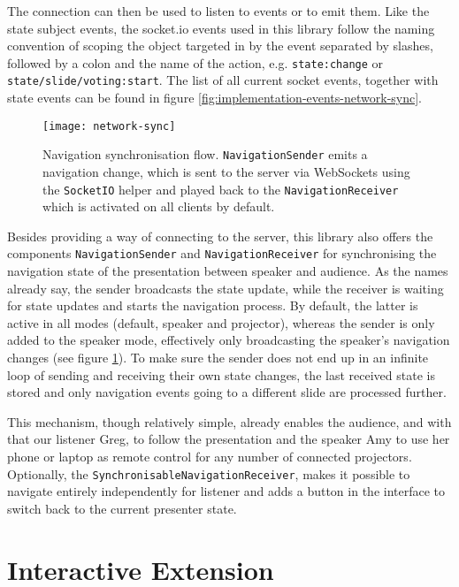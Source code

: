 The connection can then be used to listen to events or to emit them. Like the state subject events, the socket.io events used in this library follow the naming convention of scoping the object targeted in by the event separated by slashes, followed by a colon and the name of the action, e.g. \texttt{state:change} or \texttt{state/slide/voting:start}. The list of all current socket events, together with state events can be found in figure \ref{fig:implementation-events-network-sync}.

\begin{figure}
\centering
\texttt{[image: network-sync]}
\caption{Navigation synchronisation flow. \texttt{NavigationSender} emits a navigation change, which is sent to the server via WebSockets using the \texttt{SocketIO} helper and played back to the \texttt{NavigationReceiver} which is activated on all clients by default.}
\label{fig:implementation-network-sync}
\end{figure}

Besides providing a way of connecting to the server, this library also offers the components \texttt{NavigationSender} and \texttt{NavigationReceiver} for synchronising the navigation state of the presentation between speaker and audience. As the names already say, the sender broadcasts the state update, while the receiver is waiting for state updates and starts the navigation process. By default, the latter is active in all modes (default, speaker and projector), whereas the sender is only added to the speaker mode, effectively only broadcasting the speaker's navigation changes (see figure \ref{fig:implementation-network-sync}). To make sure the sender does not end up in an infinite loop of sending and receiving their own state changes, the last received state is stored and only navigation events going to a different slide are processed further.

This mechanism, though relatively simple, already enables the audience, and with that our listener Greg, to follow the presentation and the speaker Amy to use her phone or laptop as remote control for any number of connected projectors. Optionally, the \texttt{SynchronisableNavigationReceiver}, makes it possible to navigate entirely independently for listener and adds a button in the interface to switch back to the current presenter state.

\section{Interactive Extension}
\label{sec:implementation-interactive}


